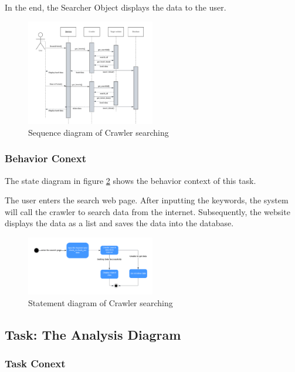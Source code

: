 \documentclass[conference]{IEEEtran}
\begin{document}
In the end, the Searcher Object displays the data to the user.
\begin{figure}[htbp]
	\centerline{\includegraphics[width=0.5\textwidth]{image/crawler searching sequence1.pdf}}
	\caption{Sequence diagram of Crawler searching }
	\label{crawlersequence1}
\end{figure}
\subsubsection{\textbf{Behavior Conext }}
\textbf{}

The state diagram in figure \ref{crawlerstatement1} shows the behavior context of this task. 

The user enters the search web page.  After inputting the keywords, the system will call the crawler to search data from the internet. Subsequently, the website displays the data as a list and saves the data into the database.

\begin{figure}[htbp]
	\centerline{\includegraphics[width=0.5\textwidth]{image/crawler searching statement1.pdf}}
	\caption{Statement diagram of Crawler searching }
	\label{crawlerstatement1}
\end{figure}



\subsection{\textbf{Task: The Analysis Diagram}}


\subsubsection{\textbf{Task Conext }}
\end{document}
